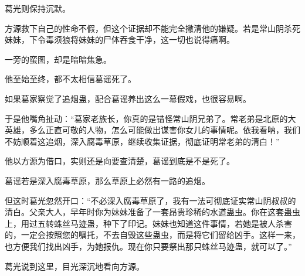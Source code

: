 \begin{this_body}
葛光则保持沉默。

方源救下自己的性命不假，但这个证据却不能完全撇清他的嫌疑。若是常山阴杀死妹妹，下令毒须狼将妹妹的尸体吞食干净，这一切也说得痛啊。

一旁的蛮图，却是暗暗焦急。

他至始至终，都不太相信葛谣死了。

如果葛家察觉了追烟蛊，配合葛谣养出这么一幕假戏，也很容易啊。

于是他嘴角扯动：“葛家老族长，你真的是错怪常山阴兄弟了。常老弟是北原的大英雄，多么正直可敬的人物，怎么可能做出谋害你女儿的事情呢。依我看呐，我们不妨顺着这追烟，深入腐毒草原，继续收集证据，彻底证明常老弟的清白！”

他以方源为借口，实则还是向要查清楚，葛谣到底是不是死了。

葛谣若是深入腐毒草原，那么草原上必然有一路的追烟。

但这时葛光忽然开口：“不必深入腐毒草原了，我有一法可彻底证实常山阴叔叔的清白。父亲大人，早年时你为妹妹准备了一套昂贵珍稀的水道蛊虫。你在这套蛊虫上，用过五转蛛丝马迹蛊，种下了印记。妹妹也知道这件事情，若她是被人杀害的，一定会按照您的嘱托，不去自毁这些蛊虫，而是将它们留给凶手。这样一来，也方便我们找出凶手，为她报仇。现在你只要祭出那只蛛丝马迹蛊，就可以了。”

葛光说到这里，目光深沉地看向方源。

\end{this_body}

